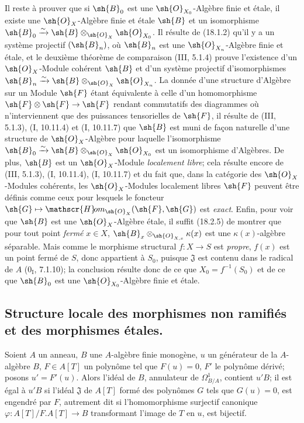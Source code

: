 Il reste à prouver que si $\sh{B}_0$ est une $\sh{O}_{X_0}$-Algèbre finie et étale, il existe une $\sh{O}_X$-Algèbre finie et étale $\sh{B}$ et un isomorphisme $\sh{B}_0\xrightarrow{\sim}\sh{B}\otimes_{\sh{O}_X}\sh{O}_{X_0}$. Il résulte de (18.1.2) qu'il y a un système projectif $(\sh{B}_n)$, où $\sh{B}_n$ est une $\sh{O}_{X_n}$-Algèbre finie et étale, et le deuxième théorème de comparaison (III, 5.1.4) prouve l'existence d'un $\sh{O}_X$-Module cohérent $\sh{B}$ et d'un système projectif d'isomorphismes $\sh{B}_n\xrightarrow{\sim}\sh{B}\otimes_{\sh{O}_X}\sh{O}_{X_n}$. La donnée d'une structure d'Algèbre sur un Module $\sh{F}$ étant équivalente à celle d'un homomorphisme $\sh{F}\otimes\sh{F}\to\sh{F}$ rendant commutatifs des diagrammes où n'interviennent que des puissances tensorielles de $\sh{F}$, il résulte de (III, 5.1.3), (I, 10.11.4) et (I, 10.11.7) que $\sh{B}$ est muni de façon naturelle d'une structure de $\sh{O}_X$-Algèbre pour laquelle l'isomorphisme $\sh{B}_0\xrightarrow{\sim}\sh{B}\otimes_{\sh{O}_X}\sh{O}_{X_0}$ est un isomorphisme d'Algèbres. De plus, $\sh{B}$ est un $\sh{O}_X$-Module \emph{localement libre}; cela résulte encore de (III, 5.1.3), (I, 10.11.4), (I, 10.11.7) et du fait que, dans la catégorie des $\sh{O}_X$-Modules cohérents, les $\sh{O}_X$-Modules localement libres $\sh{F}$ peuvent être définis comme ceux pour lesquels le foncteur $\sh{G}\mapsto\mathscr{H}\!om_{\sh{O}_X}(\sh{F},\sh{G})$ est \emph{exact}. Enfin, pour voir que $\sh{B}$ est une $\sh{O}_X$-Algèbre étale, il suffit (18.2.5) de montrer que pour tout point \emph{fermé} $x\in X$, $\sh{B}_x\otimes_{\sh{O}_{X,x}}\kappa(x)$ est une $\kappa(x)$-algèbre séparable. Mais comme le morphisme structural $f:X\to S$ est \emph{propre}, $f(x)$ est un point fermé de $S$, donc appartient à $S_0$, puisque $\mathfrak J$ est contenu dans le radical de $A$ ($0_{\mathrm I}$, 7.1.10); la conclusion résulte donc de ce que $X_0=f^{-1}(S_0)$ et de ce que $\sh{B}_0$ est une $\sh{O}_{X_0}$-Algèbre finie et étale.

\subsection{Structure locale des morphismes non ramifiés et des morphismes étales.}


\begin{lemma}[18.4.1]
\label{IV.18.4.1}
Soient $A$ un anneau, $B$ une $A$-algèbre finie monogène, $u$ un générateur de la $A$-algèbre $B$, $F\in A[T]$ un polynôme tel que $F(u)=0$, $F'$ le polynôme dérivé; posons $u'=F'(u)$. Alors l'idéal de $B$, annulateur de $\Omega^1_{B/A}$, contient $u'B$; il est égal à $u'B$ si l'idéal $\mathfrak J$ de $A[T]$ formé des polynômes $G$ tels que $G(u)=0$, est engendré par $F$, autrement dit si l'homomorphisme surjectif canonique $\varphi:A[T]/F.A[T]\to B$ transformant l'image de $T$ en $u$, est bijectif.
\end{lemma}


